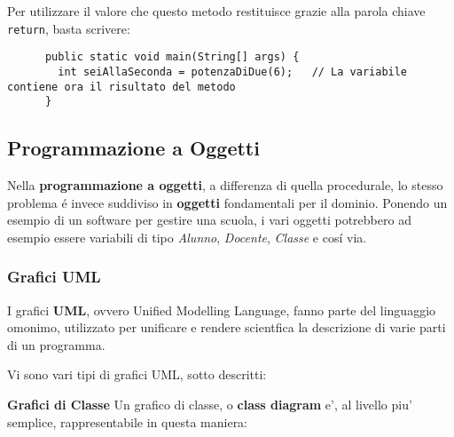 \documentclass{article}
\begin{document}
{    Per utilizzare il valore che questo metodo restituisce grazie alla parola chiave \texttt{return}, basta scrivere:

    \begin{verbatim}
      public static void main(String[] args) {
        int seiAllaSeconda = potenzaDiDue(6);   // La variabile contiene ora il risultato del metodo
      }
    \end{verbatim}

    \subsection{Programmazione a Oggetti}
    Nella \textbf{programmazione a oggetti}, a differenza di quella procedurale, lo stesso problema é invece suddiviso in \textbf{oggetti} fondamentali per il dominio. Ponendo un esempio di un software per gestire una scuola, i vari oggetti potrebbero ad esempio essere variabili di tipo \textit{Alunno}, \textit{Docente}, \textit{Classe} e cosí via.

    \subsubsection{Grafici UML}
    I grafici \textbf{UML}, ovvero Unified Modelling Language, fanno parte del linguaggio omonimo, utilizzato per unificare e rendere scientfica la descrizione di varie parti di un programma.

    Vi sono vari tipi di grafici UML, sotto descritti:

    \textbf{Grafici di Classe}
    Un grafico di classe, o \textbf{class diagram} e', al livello piu' semplice, rappresentabile in questa maniera:
    \begin{quote}
    \end{quote}
  }

  \pagebreak
\end{document}
